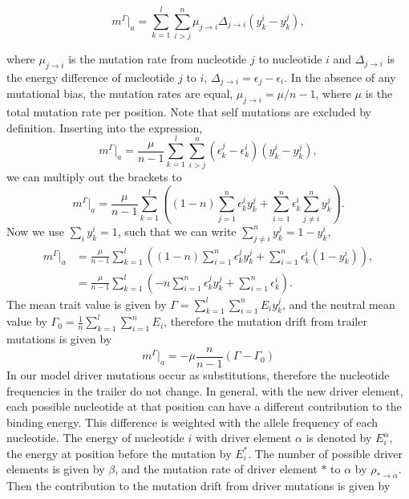 \documentclass[10pt,a4paper]{article}
\begin{document}
\begin{equation}
m^{\Gamma}|_a=\sum_{k=1}^{l}\sum_{i>j}^{n}\mu_{j\rightarrow i}\Delta_{j\rightarrow i}(y_k^i-y_k^j),
\end{equation}

\noindent where $ \mu_{j\rightarrow i}$ is the mutation rate from nucleotide $j$ to nucleotide $i$ and $\Delta_{j\rightarrow i}$ is the energy difference of nucleotide $j$ to $i$, $\Delta_{j\rightarrow i}=\epsilon_j-\epsilon_i$. In the absence of any mutational bias, the mutation rates are equal, $\mu_{j\rightarrow i}=\mu/n-1$, where $\mu$ is the total mutation rate per position. Note that self mutations are excluded by definition. Inserting into the expression,
\begin{equation}
	m^\Gamma|_a=\frac{\mu}{n-1}\sum_{k=1}^{l}\sum_{i>j}^{n}(\epsilon_k^j-\epsilon_k^i)(y_k^i-y_k^j),
\end{equation}
we can multiply out the brackets to
\begin{equation}
		m^\Gamma|_a=\frac{\mu}{n-1}\sum_{k=1}^{l}\left((1-n)\sum_{j=1}^{n}\epsilon_k^jy_k^j+\sum_{i=1}^{n}\epsilon_k^i\sum_{j\neq i}^{n}y_k^j\right).
\end{equation}
Now we use $\sum_{i}y_k^i=1$, such that we can write $\sum_{j\neq i}^{n}y_k^j = 1 - y_k^i$,
\begin{align}
m^{\Gamma}|_a&=\frac{\mu}{n-1}\sum_{k=1}^{l}\left((1-n)\sum_{i=1}^{n}\epsilon_k^jy_k^j+\sum_{i=1}^{n}\epsilon_k^i(1-y_k^i)\right),\nonumber\\
&=\frac{\mu}{n-1}\sum_{k=1}^{l}\left(-n\sum_{i=1}^{n}\epsilon_k^jy_k^j+\sum_{i=1}^{n}\epsilon_k^i\right).
\end{align}
The mean trait value is given by $\Gamma=\sum_{k=1}^l\sum_{i=1}^{n}E_iy_k^j$, and the neutral mean value by $\Gamma_0=\frac{1}{n}\sum_{k=1}^l\sum_{i=1}^nE_i$, therefore the mutation drift from trailer mutations is given by
\begin{equation}
	m^{\Gamma}|_a=-\mu\frac{n}{n-1}\left(\Gamma-\Gamma_0\right)
\end{equation}
In our model driver mutations occur as substitutions, therefore the nucleotide frequencies in the trailer do not change. In general, with the new driver element, each possible nucleotide at that position can have a different contribution to the binding energy. This difference is weighted with the allele frequency of each nucleotide. The energy of nucleotide $i$ with driver element $\alpha$ is denoted by $E^\alpha_i$, the energy at position before the mutation by $E^*_i$. The number of possible driver elements is given by $\beta$, and the mutation rate of driver element $*$ to $\alpha$ by $\rho_{*\rightarrow\alpha}$. Then the contribution to the mutation drift from driver mutations is given by
\end{document}
